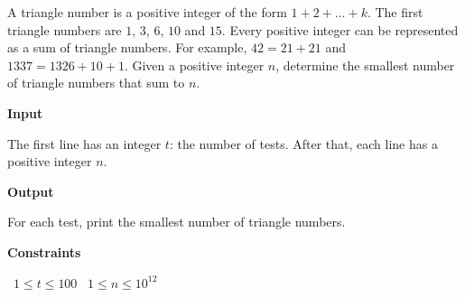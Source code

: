 A triangle number is a positive integer of the form $1+2+\dots+k$. The first triangle numbers are $1$, $3$, $6$, $10$ and $15$.
Every positive integer can be represented as a sum of triangle numbers. For example, $42=21+21$ and $1337=1326+10+1$.
Given a positive integer $n$, determine the smallest number of triangle numbers that sum to $n$.

\vspace{0.3cm}\noindent\textbf{Input}

The first line has an integer $t$: the number of tests.
After that, each line has a positive integer $n$.

\vspace{0.3cm}\noindent\textbf{Output}

For each test, print the smallest number of triangle numbers.

\vspace{0.3cm}\noindent\textbf{Constraints}

\textbullet\ $1 \le t \le 100$
\textbullet\ $1 \le n \le 10^{12}$
